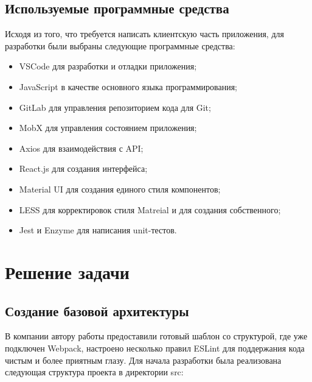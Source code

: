 \documentclass[14pt, a4paper]{diplom}
\begin{document}
\section{Используемые программные средства}

Исходя из того, что требуется написать клиентскую часть приложения, для разработки были выбраны следующие программные средства:

\begin{itemize}
\item VSCode для разработки и отладки приложения;
\item JavaScript в качестве основного языка программирования;
\item GitLab для управления репозиторием кода для Git;
\item MobX для управления состоянием приложения;
\item Axios для взаимодействия с API;
\item React.js для создания интерфейса;
\item Material UI для создания единого стиля компонентов;
\item LESS для корректировок стиля Matreial и для создания собственного;
\item Jest и Enzyme для написания unit-тестов.
\end{itemize}

\chapter{Решение задачи}

\section{Создание базовой архитектуры}
В компании автору работы предоставили готовый шаблон со структурой, где уже подключен Webpack, настроено несколько правил ESLint для поддержания кода чистым и более приятным глазу.
Для начала разработки была реализована следующая структура проекта в директории src:

\medskip

\renewcommand*\DTstyle{\ttfamily\textcolor{black}}
\end{document}
